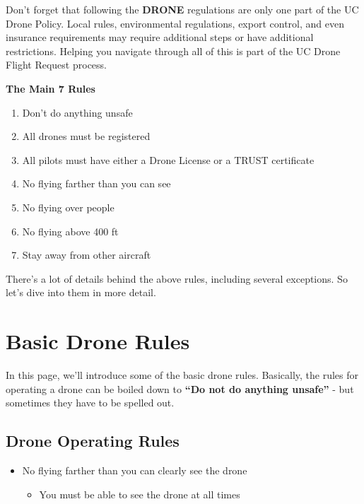 \documentclass[
  12pt,
]{book}
\providecommand{\tightlist}{%
  \setlength{\itemsep}{0pt}\setlength{\parskip}{0pt}}
\newenvironment{notebox}{
  \definecolor{shadecolor}{gray}{.8}  %
  \color{black}
  \begin{shaded}}
 {\end{shaded}}
\begin{document}
\begin{notebox}
Don't forget that following the \textbf{DRONE} regulations are only one part of the UC Drone Policy. Local rules, environmental regulations, export control, and even insurance requirements may require additional steps or have additional restrictions. Helping you navigate through all of this is part of the UC Drone Flight Request process.

\end{notebox}

\textbf{The Main 7 Rules}

\begin{enumerate}
\def\labelenumi{\arabic{enumi}.}
\tightlist
\item
  Don't do anything unsafe
\item
  All drones must be registered
\item
  All pilots must have either a Drone License or a TRUST certificate
\item
  No flying farther than you can see
\item
  No flying over people
\item
  No flying above 400 ft
\item
  Stay away from other aircraft
\end{enumerate}

There's a lot of details behind the above rules, including several exceptions. So let's dive into them in more detail.

\hypertarget{basic-drone-rules}{%
\section{Basic Drone Rules}\label{basic-drone-rules}}

In this page, we'll introduce some of the basic drone rules. Basically, the rules for operating a drone can be boiled down to \textbf{``Do not do anything unsafe''} - but sometimes they have to be spelled out.

\hypertarget{drone-operating-rules}{%
\subsection{Drone Operating Rules}\label{drone-operating-rules}}

\begin{itemize}
\tightlist
\item
  No flying farther than you can clearly see the drone

  \begin{itemize}
  \tightlist
  \item
    You must be able to see the drone at all times
  \end{itemize}
\end{itemize}
\end{document}
